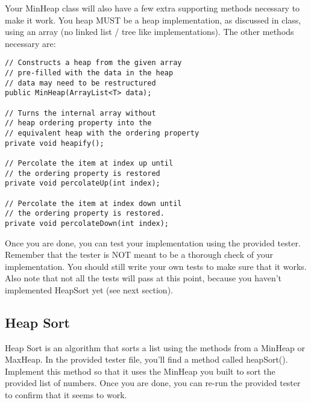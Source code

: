 \documentclass[paper=a4, fontsize=11pt, parskip=full]{scrartcl} %
\numberwithin{equation}{section} %
\numberwithin{figure}{section} %
\numberwithin{table}{section} %
\begin{document}
Your MinHeap class will also have a few extra supporting methods necessary to make it work. You heap MUST be a heap implementation, as discussed in class, using an array (no linked list / tree like implementations). The other methods necessary are: 

\begin{lstlisting}
// Constructs a heap from the given array
// pre-filled with the data in the heap
// data may need to be restructured
public MinHeap(ArrayList<T> data);

// Turns the internal array without
// heap ordering property into the
// equivalent heap with the ordering property
private void heapify();

// Percolate the item at index up until
// the ordering property is restored
private void percolateUp(int index);

// Percolate the item at index down until
// the ordering property is restored.
private void percolateDown(int index);
\end{lstlisting}

Once you are done, you can test your implementation using the provided tester. Remember that the tester is NOT meant to be a thorough check of your implementation. You should still write your own tests to make sure that it works. Also note that not all the tests will pass at this point, because you haven't implemented HeapSort yet (see next section).

\subsection{Heap Sort}

Heap Sort is an algorithm that sorts a list using the methods from a MinHeap or MaxHeap. In the provided tester file, you'll find a method called heapSort(). Implement this method so that it uses the MinHeap you built to sort the provided list of numbers. Once you are done, you can re-run the provided tester to confirm that it seems to work.




\end{document}
